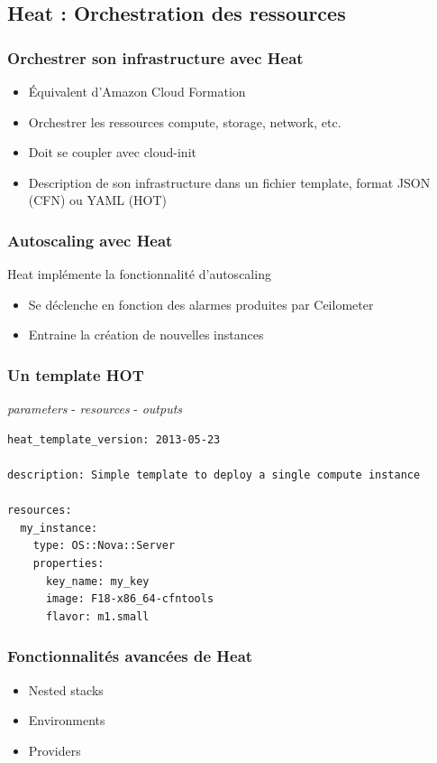   \subsection[Heat]{Heat : Orchestration des ressources}

  \begin{frame}
    \frametitle{Orchestrer son infrastructure avec Heat}
    \begin{itemize}
      \item Équivalent d'Amazon Cloud Formation
      \item Orchestrer les ressources compute, storage, network, etc.
      \item Doit se coupler avec cloud-init\pause
      \item Description de son infrastructure dans un fichier template, format JSON (CFN) ou YAML (HOT)
    \end{itemize}
  \end{frame}

  \begin{frame}
    \frametitle{Autoscaling avec Heat}
    Heat implémente la fonctionnalité d'autoscaling
    \begin{itemize}
      \item Se déclenche en fonction des alarmes produites par Ceilometer
      \item Entraine la création de nouvelles instances
    \end{itemize}
  \end{frame}

  \begin{frame}[containsverbatim]
    \frametitle{Un template HOT}
    \textit{parameters} - \textit{resources} - \textit{outputs}
\begin{verbatim}
heat_template_version: 2013-05-23

description: Simple template to deploy a single compute instance

resources:
  my_instance:
    type: OS::Nova::Server
    properties:
      key_name: my_key
      image: F18-x86_64-cfntools
      flavor: m1.small
\end{verbatim}
  \end{frame}

  \begin{frame}
    \frametitle{Fonctionnalités avancées de Heat}
    \begin{itemize}
      \item Nested stacks
      \item Environments
      \item Providers
    \end{itemize}
  \end{frame}

